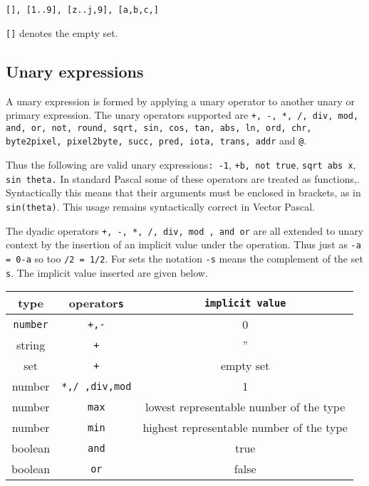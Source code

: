 {\texttt{{[}{]}, {[}1..9{]}, {[}z..j,9{]}, {[}a,b,c,{]}}

\texttt{{[}{]}} denotes the empty set.


\subsection{Unary expressions}

A unary expression is formed by applying a unary operator to another unary or
primary expression. The unary operators supported are \texttt{+, -, {*}, /,
div, mod, and, or, not,
round, sqrt, sin, cos, tan,
abs, ln, ord, chr, byte2pixel,
pixel2byte, succ, pred, iota,
trans, addr} and \texttt{@}.

Thus the following are valid unary expressions\texttt{: -1}, {\tt +b, not true}, {\tt sqrt
abs x}, {\tt sin theta.}\label{primfns} In standard Pascal some of these operators are treated as
functions,. Syntactically this means that their arguments must be enclosed in
brackets, as in \texttt{sin(theta)}. This usage remains syntactically correct
in Vector Pascal. 

The dyadic operators \texttt{+, -, {*}, /, div, mod , and or} are all extended
to unary context by the insertion of an implicit value under the operation.
Thus just as \texttt{-a = 0-a} so too \texttt{/2 = 1/2}. For sets the notation
\texttt{-s} means the complement of the set \texttt{s}. The implicit value inserted
are given below.

\vspace{0.3cm}
{\centering \begin{tabular}{|c|c|c|}
\hline 
type&
operator\texttt{s}&
\texttt{implicit value}\\
\hline 
\hline 
\texttt{number}&
\texttt{+,-}&
0\\
\hline 
string&
\texttt{+}&
''\\
\hline 
set\index{set}&
\texttt{+}&
empty set\\
\hline 
number&
\texttt{{*},/ ,div,mod}&
1\\
\hline 
number&
\texttt{max}&
lowest representable number of the type\\
\hline 
number&
\texttt{min}&
highest representable number of the type\\
\hline 
boolean\index{boolean}&
\texttt{and}&
true\\
\hline 
boolean&
\texttt{or} &
false\\
\hline 
\end{tabular}\par}
\vspace{0.3cm}

}
